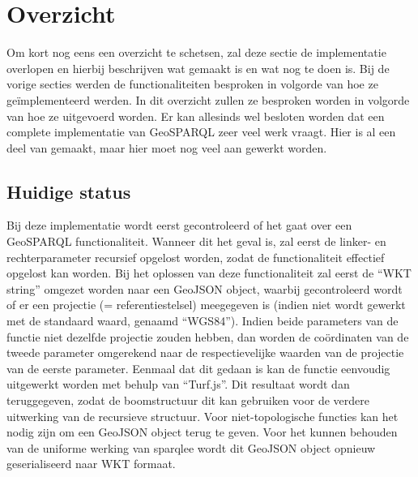 \section{Overzicht}
Om kort nog eens een overzicht te schetsen, zal deze sectie de implementatie overlopen en hierbij beschrijven wat gemaakt is en wat nog te doen is. Bij de vorige secties werden de functionaliteiten besproken in volgorde van hoe ze geïmplementeerd werden. In dit overzicht zullen ze besproken worden in volgorde van hoe ze uitgevoerd worden. Er kan allesinds wel besloten worden dat een complete implementatie van GeoSPARQL zeer veel werk vraagt. Hier is al een deel van gemaakt, maar hier moet nog veel aan gewerkt worden.

\subsection{Huidige status}
Bij deze implementatie wordt eerst gecontroleerd of het gaat over een GeoSPARQL functionaliteit. Wanneer dit het geval is, zal eerst de linker- en rechterparameter recursief opgelost worden, zodat de functionaliteit effectief opgelost kan worden. Bij het oplossen van deze functionaliteit zal eerst de ``WKT string'' omgezet worden naar een GeoJSON object, waarbij gecontroleerd wordt of er een projectie (= referentiestelsel) meegegeven is (indien niet wordt gewerkt met de standaard waard, genaamd ``WGS84''). Indien beide parameters van de functie niet dezelfde projectie zouden hebben, dan worden de coördinaten van de tweede parameter omgerekend naar de respectievelijke waarden van de projectie van de eerste parameter. Eenmaal dat dit gedaan is kan de functie eenvoudig uitgewerkt worden met behulp van ``Turf.js''. Dit resultaat wordt dan teruggegeven, zodat de boomstructuur dit kan gebruiken voor de verdere uitwerking van de recursieve structuur. Voor niet-topologische functies kan het nodig zijn om een GeoJSON object terug te geven. Voor het kunnen behouden van de uniforme werking van sparqlee wordt dit GeoJSON object opnieuw geserialiseerd naar WKT formaat. 

